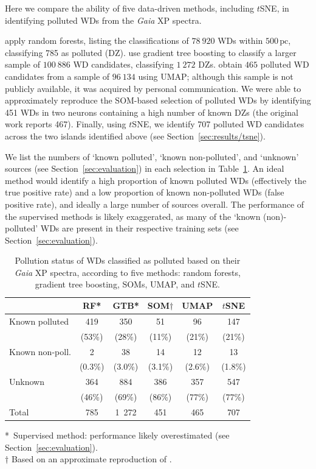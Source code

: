 \documentclass[fleqn,usenatbib]{rasti}
\begin{document}
Here we compare the ability of five data-driven methods, including $t$SNE, in identifying polluted WDs from the \textit{Gaia} XP spectra.

\citet{garciazamora25} apply random forests, listing the classifications of $78~920$ WDs within $500\,\text{pc}$, classifying 785 as polluted (DZ).
\citet{vincent24} use gradient tree boosting to classify a larger sample of $100~886$ WD candidates, classifying $1~272$ DZs.
\citet{kao24} obtain $465$ polluted WD candidates from a sample of $96~134$ using UMAP; although this sample is not publicly available, it was acquired by personal communication.
We were able to approximately reproduce the SOM-based selection of polluted WDs by \citet{perezcouto24} identifying 451 WDs in two neurons containing a high number of known DZs (the original work reports 467).
Finally, using $t$SNE, we identify 707 polluted WD candidates across the two islands identified above (see Section~\ref{sec:results/tsne}).

We list the numbers of `known polluted', `known non-polluted', and `unknown' sources (see Section~\ref{sec:evaluation}) in each selection in Table~\ref{tab:evaluation}.
An ideal method would identify a high proportion of known polluted WDs (effectively the true positive rate) and a low proportion of known non-polluted WDs (false positive rate), and ideally a large number of sources overall.
The performance of the supervised methods is likely exaggerated, as many of the `known (non)-polluted' WDs are present in their respective training sets (see Section~\ref{sec:evaluation}).

\begin{table}
\caption{
    Pollution status of WDs classified as polluted based on their \textit{Gaia} XP spectra, according to five methods: random forests, gradient tree boosting, SOMs, UMAP, and $t$SNE.
}
\label{tab:evaluation}
 
\begin{tabular}{lccccc}
    \hline
    & RF* & GTB* & SOM$\dagger$ & UMAP & $t$SNE \\
    \hline
    Known polluted & 419 & 350 & 51 & 96 & 147\\
    & (53\%) & (28\%) & (11\%) & (21\%) & (21\%) \\
    Known non-poll. & 2 & 38 & 14 & 12 & 13 \\
    & (0.3\%) & (3.0\%) & (3.1\%) & (2.6\%) & (1.8\%) \\
    Unknown & 364 & 884 & 386 & 357 & 547 \\
    & (46\%) & (69\%) & (86\%) & (77\%) & (77\%) \\
    Total & 785 & 1~272 & 451 & 465 & 707 \\
    \hline
 \end{tabular}
*~Supervised method: performance likely overestimated (see Section~\ref{sec:evaluation}).\\
$\dagger$ Based on an approximate reproduction of \citet{perezcouto24}.
\end{table}
\end{document}
